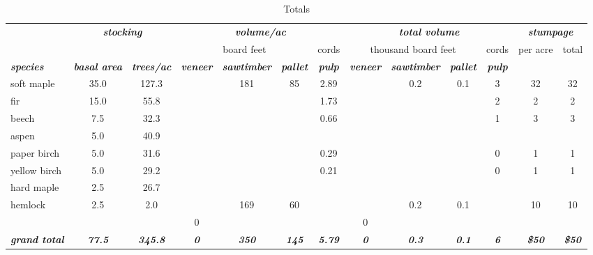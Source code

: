 \documentclass[landscape]{article}
\begin{document}
\begin{table}[H]

\caption{\label{tab:unnamed-chunk-30}Totals}
\fontsize{10}{12}\selectfont
\begin{tabular}[t]{lcccccccccccc}
\toprule
\multicolumn{1}{c}{\em{\textbf{ }}} & \multicolumn{2}{c}{\em{\textbf{stocking}}} & \multicolumn{4}{c}{\em{\textbf{volume/ac }}} & \multicolumn{4}{c}{\em{\textbf{total volume}}} & \multicolumn{2}{c}{\em{\textbf{stumpage}}} \\
\cmidrule(l{3pt}r{3pt}){2-3} \cmidrule(l{3pt}r{3pt}){4-7} \cmidrule(l{3pt}r{3pt}){8-11} \cmidrule(l{3pt}r{3pt}){12-13}
\multicolumn{3}{c}{ } & \multicolumn{3}{c}{board feet} & \multicolumn{1}{c}{cords} & \multicolumn{3}{c}{thousand board feet} & \multicolumn{1}{c}{cords} & \multicolumn{1}{c}{per acre} & \multicolumn{1}{c}{total} \\
\cmidrule(l{3pt}r{3pt}){4-6} \cmidrule(l{3pt}r{3pt}){7-7} \cmidrule(l{3pt}r{3pt}){8-10} \cmidrule(l{3pt}r{3pt}){11-11} \cmidrule(l{3pt}r{3pt}){12-12} \cmidrule(l{3pt}r{3pt}){13-13}
\rowcolor[HTML]{DCDCDC}  \em{\textbf{species}} & \em{\textbf{basal area}} & \em{\textbf{trees/ac}} & \em{\textbf{veneer}} & \em{\textbf{sawtimber}} & \em{\textbf{pallet}} & \em{\textbf{pulp}} & \em{\textbf{veneer}} & \em{\textbf{sawtimber}} & \em{\textbf{pallet}} & \em{\textbf{pulp}} & \em{\textbf{ }} & \em{\textbf{ }}\\
\midrule
\rowcolor{gray!6}  soft maple & 35.0 & 127.3 &  & 181 & 85 & 2.89 &  & 0.2 & 0.1 & 3 & 32 & 32\\
 
fir & 15.0 & 55.8 &  &  &  & 1.73 &  &  &  & 2 & 2 & 2\\
 
\rowcolor{gray!6}  beech & 7.5 & 32.3 &  &  &  & 0.66 &  &  &  & 1 & 3 & 3\\
 
aspen & 5.0 & 40.9 &  &  &  &  &  &  &  &  &  & \\
 
\rowcolor{gray!6}  paper birch & 5.0 & 31.6 &  &  &  & 0.29 &  &  &  & 0 & 1 & 1\\
 
yellow birch & 5.0 & 29.2 &  &  &  & 0.21 &  &  &  & 0 & 1 & 1\\
 
\rowcolor{gray!6}  hard maple & 2.5 & 26.7 &  &  &  &  &  &  &  &  &  & \\
 
hemlock & 2.5 & 2.0 &  & 169 & 60 &  &  & 0.2 & 0.1 &  & 10 & 10\\
 
\rowcolor{gray!6}   &  &  & 0 &  &  &  & 0 &  &  &  &  & \\
 
\rowcolor[HTML]{DCDCDC}  \em{\textbf{grand total}} & \em{\textbf{77.5}} & \em{\textbf{345.8}} & \em{\textbf{0}} & \em{\textbf{350}} & \em{\textbf{145}} & \em{\textbf{5.79}} & \em{\textbf{0}} & \em{\textbf{0.3}} & \em{\textbf{0.1}} & \em{\textbf{6}} & \em{\textbf{\$50}} & \em{\textbf{\$50}}\\
\bottomrule
\end{tabular}
\end{table}
\end{document}
